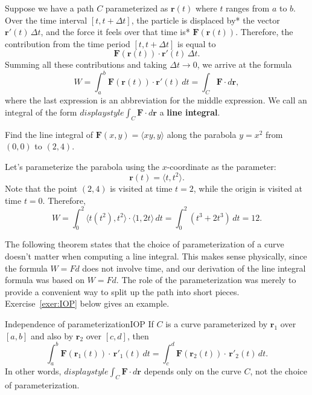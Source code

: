 \documentclass[indent]{watsonbook}
\begin{document}
Suppose we have a path $C$ parameterized as $\mathbf{r}(t)$ where $t$
ranges from $a$ to $b$. Over the time interval $[t,t+\Delta t]$, the
particle is displaced by* the vector $\mathbf{r}'(t) \, \Delta t$, and
the force it feels over that time is* $\mathbf{F}(\mathbf{r}(t))$.
Therefore, the contribution from the time period $[t, t+\Delta t]$ is
equal to 
\[
  \mathbf{F}(\mathbf{r}(t)) \cdot \mathbf{r}'(t) \, \Delta t.
\]
Summing all these contributions and taking $\Delta t \to 0$, we arrive
at the formula
\[
  W = \int_a^b \mathbf{F}(\mathbf{r}(t)) \cdot \mathbf{r}'(t) \, {{d}}t =
  \int_C \mathbf{F} \cdot {d}\mathbf{r},
\]
where the last expression is an abbreviation for the middle
expression. We call an integral of the form ${d}isplaystyle{\int_C \mathbf{F} \cdot
  {d}\mathbf{r}}$ a \textbf{line integral}.

\begin{example}{}{}
  Find the line integral of $\mathbf{F}(x,y) = \langle xy, y \rangle$
  along the parabola $y = x^2$ from
  $(0,0)$ to $(2,4)$.
\end{example}

\begin{solution}
  Let's parameterize the parabola using the $x$-coordinate as the
  parameter:
  \[
    \mathbf{r}(t) = \langle t, t^2 \rangle.
  \]
  Note that the point $(2,4)$ is visited at time $t=2$, while the
  origin is visited at time $t=0$. Therefore,
  \[
    W = \int_0^2 \langle t(t^2), t^2 \rangle \cdot \langle 1, 2t \rangle
    \, {{d}}t = \int_0^2 (t^3 + 2t^3) \, {{d}}t = \boxed{12}.
  \]
\end{solution}

The following theorem states that the choice of parameterization of a
curve doesn't matter when computing a line integral. This makes sense
physically, since the formula $W = Fd$ does not involve time, and our
derivation of the line integral formula was based on $W=Fd$. The role
of the parameterization was merely to provide a convenient way to
split up the path into short pieces. Exercise~\ref{exer:IOP} below
gives an example.

\begin{theo}{Independence of parameterization}{IOP}
  If $C$ is a curve parameterized by $\mathbf{r}_1$ over $[a,b]$ and
  also by $\mathbf{r}_2$ over $[c,d]$, then
  \[
    \int_a^b\mathbf{F}(\mathbf{r}_1(t))  \cdot \,
    \mathbf{r}'_1(t) \, {{d}}t =
    \int_c^d \mathbf{F}(\mathbf{r}_2(t))  \cdot \,
    \mathbf{r}'_2(t) \, {{d}}t.
  \]
  In other words,
  ${d}isplaystyle{\int_C \mathbf{F} \cdot {d}\mathbf{r}}$ depends only
  on the curve $C$, not the choice of parameterization.
\end{theo}
\end{document}

